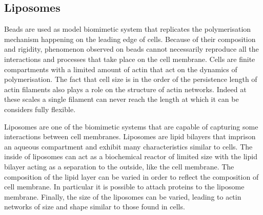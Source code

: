 \documentclass[A4paperpaper,11pt,english]{sphinxmanual}
\begin{document}
\subsection{Liposomes}
\label{index-latex:liposomes}
Beads are used as model biomimetic system that replicates the polymerisation mechanism
happening on the leading edge of cells. Because of their composition and
rigidity, phenomenon observed on beads cannot necessarily reproduce all the interactions and
processes that take place on the cell membrane. Cells are finite compartments with a
limited amount of actin that act on the dynamics of polymerisation.  The fact
that cell size is in the order of the persistence length of actin filaments
also plays a role on the structure of actin networks. Indeed at these scales a
single filament can never reach the length at which it can be considers fully
flexible.

Liposomes are one of the biomimetic systems that are capable of capturing some
interactions between cell membranes. Liposomes are lipid bilayers that imprison
an aqueous compartment and exhibit many characteristics similar to cells.
The inside of liposomes can act as a biochemical reactor of limited size with
the lipid bilayer acting as a separation to the outside, like the cell
membrane. The composition of the lipid layer can be varied in order to reflect
the composition of cell membrane. In particular it is possible to attach
proteins to the liposome membrane. Finally, the size of the liposomes can be
varied, leading to actin networks of size and shape similar to those found in
cells.
\end{document}
